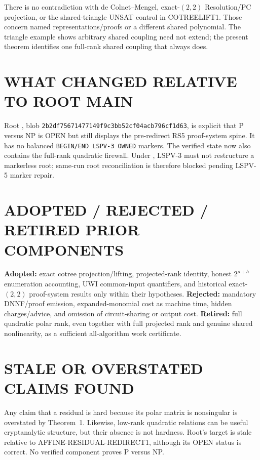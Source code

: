 \documentclass[11pt]{article}
\begin{document}
There is no contradiction with de Colnet--Mengel, exact-$(2,2)$
Resolution/PC projection, or the shared-triangle UNSAT control in COTREELIFT1.
Those concern named representations/proofs or a different shared polynomial.
The triangle example shows arbitrary shared coupling need not extend; the
present theorem identifies one full-rank shared coupling that always does.

\section{WHAT CHANGED RELATIVE TO ROOT MAIN}
Root , blob
\texttt{2b2df75671477149f9c3bb52cf04acb796cf1d63}, is explicit that P versus NP
is OPEN but still displays the pre-redirect RS5 proof-system spine.  It has no
balanced \texttt{BEGIN/END LSPV-3 OWNED} markers.  The verified state now also
contains the full-rank quadratic firewall.  Under , LSPV-3
must not restructure a markerless root; same-run root reconciliation is
therefore blocked pending LSPV-5 marker repair.

\section{ADOPTED / REJECTED / RETIRED PRIOR COMPONENTS}
\textbf{Adopted:} exact cotree projection/lifting, projected-rank identity,
honest $2^{\rho+h}$ enumeration accounting, UWI common-input quantifiers, and
historical exact-$(2,2)$ proof-system results only within their hypotheses.
\textbf{Rejected:} mandatory DNNF/proof emission, expanded-monomial cost as
machine time, hidden charges/advice, and omission of circuit-sharing or output
cost.  \textbf{Retired:} full quadratic polar rank, even together with full
projected rank and genuine shared nonlinearity, as a sufficient
all-algorithm work certificate.

\section{STALE OR OVERSTATED CLAIMS FOUND}
Any claim that a residual is hard because its polar matrix is nonsingular is
overstated by Theorem~1.  Likewise, low-rank quadratic relations can be useful
cryptanalytic structure, but their absence is not hardness.  Root's target is
stale relative to AFFINE-RESIDUAL-REDIRECT1, although its OPEN status is
correct.  No verified component proves P versus NP.
\end{document}
